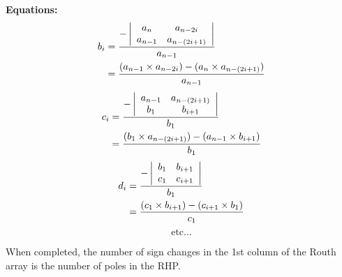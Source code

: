 \documentclass{book}
\begin{document}
\begin{minipage}[t]{0.35\textwidth}\centering
	\textbf{Equations:}
	\small
	\begin{align*}
	b_i &= \dfrac{-\left|\begin{array}{c c} a_n & a_{n-2i} \\ a_{n-1} & a_{n-(2i+1)} \end{array}\right|}{a_{n-1}} \\ 
	& = \frac{(a_{n-1}\times a_{n-2i}) - (a_{n}\times a_{n-(2i+1)})}{a_{n-1}}
	\end{align*}\vspace{-1.5em}
	\begin{align*}
	c_i &= \dfrac{-\left|\begin{array}{c c} a_{n-1} & a_{n-(2i+1)} \\ b_{1} & b_{i+1} \end{array}\right|}{b_{1}} \\
	& = \frac{(b_1\times a_{n-(2i+1)}) - (a_{n-1}\times b_{i+1})}{b_1}
	\end{align*}\vspace{-1.5em}
	\begin{align*}
	d_i &= \dfrac{-\left|\begin{array}{c c} b_{1} & b_{i+1} \\ c_{1} & c_{i+1} \end{array}\right|}{b_{1}} \\
	&= \frac{(c_1\times b_{i+1}) - (c_{i+1}\times b_{1})}{c_1}
	\end{align*}\vspace{-1.5em}
	\[ \text{etc}\ldots \]
\end{minipage}\vspace{1em}

When completed, the number of sign changes in the 1st column of the Routh array is the number of poles in the RHP. \vspace{1em}
\end{document}
